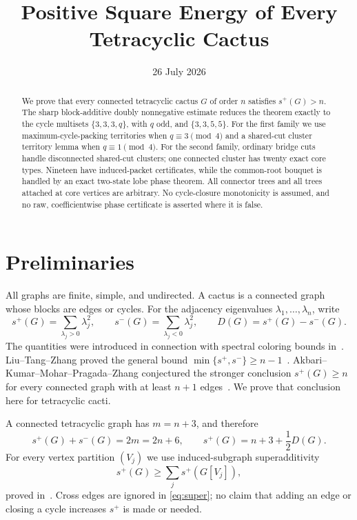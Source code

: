\documentclass[11pt]{article}
\title{Positive Square Energy of Every Tetracyclic Cactus}
\author{}
\date{26 July 2026}
\theoremstyle{remark}
\begin{document}
\maketitle

\begin{abstract}
We prove that every connected tetracyclic cactus $G$ of order $n$ satisfies
$s^+(G)>n$.  The sharp block-additive doubly nonnegative estimate reduces
the theorem exactly to the cycle multisets
$\{3,3,3,q\}$, with $q$ odd, and $\{3,3,5,5\}$.  For the first family we use
maximum-cycle-packing territories when $q\equiv3\pmod4$ and a shared-cut
cluster territory lemma when $q\equiv1\pmod4$.  For the second family,
ordinary bridge cuts handle disconnected shared-cut clusters; one connected
cluster has twenty exact core types.  Nineteen have induced-packet
certificates, while the common-root bouquet is handled by an exact two-state
lobe phase theorem.  All connector trees and all trees attached at core
vertices are arbitrary.  No cycle-closure monotonicity is assumed, and no
raw, coefficientwise phase certificate is asserted where it is false.
\end{abstract}

\section{Preliminaries}

All graphs are finite, simple, and undirected.  A cactus is a connected graph
whose blocks are edges or cycles.  For the adjacency eigenvalues
$\lambda_1,\ldots,\lambda_n$, write
\[
 s^+(G)=\sum_{\lambda_j>0}\lambda_j^2,
 \qquad s^-(G)=\sum_{\lambda_j<0}\lambda_j^2,
 \qquad D(G)=s^+(G)-s^-(G).
\]
The quantities were introduced in connection with spectral coloring bounds
in~\cite{AbiadEtAl}.  Liu--Tang--Zhang proved the general bound
$\min\{s^+,s^-\}\geq n-1$~\cite{LTZ}.  Akbari--Kumar--Mohar--Pragada--Zhang
conjectured the stronger conclusion $s^+(G)\geq n$ for every connected graph
with at least $n+1$ edges~\cite{AKMPZ}.  We prove that conclusion here for
tetracyclic cacti.

A connected tetracyclic graph has $m=n+3$, and therefore
\begin{equation}\label{eq:average}
 s^+(G)+s^-(G)=2m=2n+6,
 \qquad s^+(G)=n+3+\frac12D(G).
\end{equation}
For every vertex partition $(V_j)$ we use induced-subgraph superadditivity
\begin{equation}\label{eq:super}
 s^+(G)\geq\sum_j s^+(G[V_j]),
\end{equation}
proved in~\cite{AKMP}.  Cross edges are ignored in \eqref{eq:super}; no claim
that adding an edge or closing a cycle increases $s^+$ is made or needed.
\end{document}
